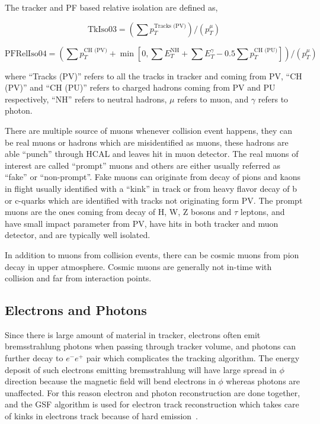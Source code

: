 The tracker and \gls{PF} based relative isolation are defined as,

\begin{equation}\label{eq:trackerRelIso-muon}
  \text{TkIso03} = \left( \sum p_{T}^{\text{Tracks (PV)}} \right) /
  \left( p_{T}^{\mu} \right)
\end{equation}

\begin{equation}\label{eq:pfRelIso-muon}
  \text{PFRelIso04} = \left( \sum p_{T}^{\text{CH (PV)}}
  + \min \left[ 0, \sum E_{T}^{\text{NH}} + \sum E_{T}^{\gamma}
    - 0.5 \sum p_{T}^{\text{CH (PU)}} \right] \right) /
  \left( p_{T}^{\mu} \right)
\end{equation}

where ``Tracks (PV)'' refers to all the tracks in tracker and coming from \gls{PV},
``CH (PV)'' and ``CH (PU)'' refers to charged hadrons coming from \gls{PV} and \gls{PU}
respectively, ``NH'' refers to neutral hadrons, \( \mu \) refers to muon, and
\( \gamma \) refers to photon.

There are multiple source of muons whenever collision event happens, they can be
real muons or hadrons which are misidentified as muons, these hadrons
are able ``punch'' through \gls{HCAL} and leaves hit in muon detector. The real
muons of interest are called ``prompt'' muons and others are either usually referred
as ``fake'' or ``non-prompt''. Fake muons can originate from decay of pions and kaons in flight
usually identified with a ``kink'' in track or from heavy flavor decay of b or c-quarks
which are identified with tracks not originating form \gls{PV}.
The prompt muons are the ones coming from decay of H, W, Z bosons and \( \tau \) leptons,
and have small impact parameter from \gls{PV}, have hits in both tracker
and muon detector, and are typically well isolated.

In addition to muons from collision events, there can be cosmic muons from pion decay in
upper atmosphere. Cosmic muons are generally not in-time with collision and far from
interaction points.

\subsection{
  Electrons and Photons
}

Since there is large amount of material in tracker, electrons often emit bremsstrahlung
photons when passing through tracker volume,
and photons can further decay to \( e^- e^+ \) pair which complicates the
tracking algorithm. The energy deposit of such electrons
emitting bremsstrahlung will have large spread in \( \phi \) direction because
the magnetic field will bend electrons in \( \phi \) whereas photons are unaffected.
For this reason electron and photon reconstruction are done together, and
the \gls{GSF} algorithm is used for electron track reconstruction
which takes care of kinks in electrons track because of hard emission~\cite{cms-electron-gsf}.

